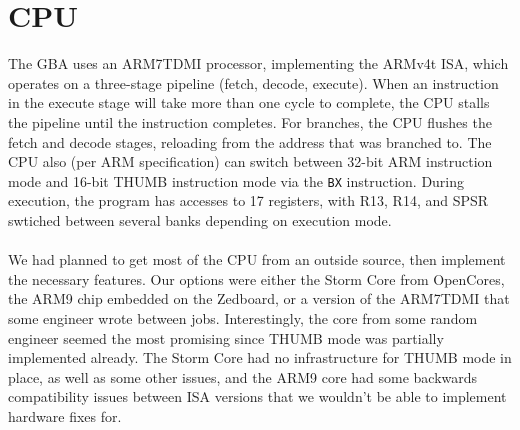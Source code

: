 \documentclass[11pt,a4paper,draft]{article}
\begin{document}
	\section{CPU}
	The GBA uses an ARM7TDMI processor, implementing the ARMv4t ISA, which operates on a three-stage pipeline (fetch, decode, execute). When an instruction in the execute stage will take more than one cycle to complete, the CPU stalls the pipeline until the instruction completes. For branches, the CPU flushes the fetch and decode stages, reloading from the address that was branched to. The CPU also (per ARM specification) can switch between 32-bit ARM instruction mode and 16-bit THUMB instruction mode via the \texttt{BX} instruction. During execution, the program has accesses to 17 registers, with R13, R14, and SPSR swtiched between several banks depending on execution mode.\\\\
	We had planned to get most of the CPU from an outside source, then implement the necessary features. Our options were either the Storm Core from OpenCores, the ARM9 chip embedded on the Zedboard, or a version of the ARM7TDMI that some engineer wrote between jobs. Interestingly, the core from some random engineer seemed the most promising since THUMB mode was partially implemented already. The Storm Core had no infrastructure for THUMB mode in place, as well as some other issues, and the ARM9 core had some backwards compatibility issues between ISA versions that we wouldn't be able to implement hardware fixes for.
	
\end{document}
